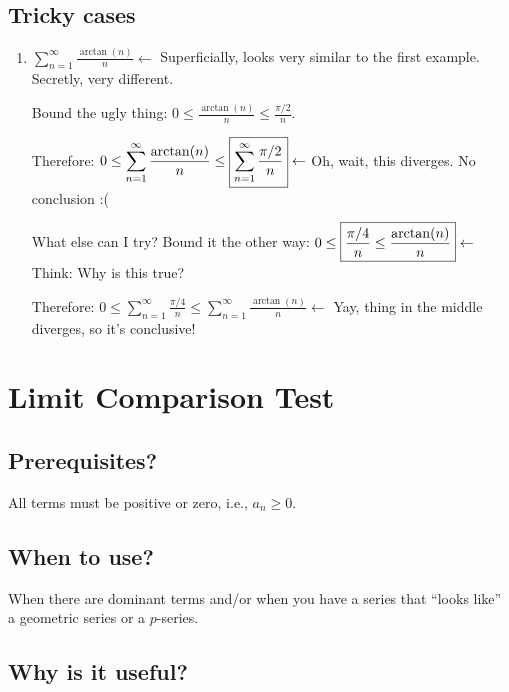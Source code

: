 \documentclass[11pt]{article}
\begin{document}
\subsection{Tricky cases}

\begin{enumerate}

  \item $\displaystyle \sum_{n=1}^\infty \frac{\arctan(n)}{n} \gets$
  Superficially, looks very similar to the first example. Secretly, very
  different.

  Bound the ugly thing: $\displaystyle 0 \leq \frac{\arctan(n)}{n} \leq
  \frac{\pi/2}{n}$.

  Therefore: $\displaystyle 0 \leq \displaystyle \sum_{n=1}^\infty
  \frac{\arctan(n)}{n} \leq
  \fbox{$\displaystyle\sum_{n=1}^\infty\frac{\pi/2}{n}$} \gets$ Oh, wait, this
  diverges. No conclusion :(

  What else can I try? Bound it the other way: $\displaystyle 0 \leq
  \fbox{$\displaystyle \frac{\pi/4}{n}
  \leq \frac{\arctan(n)}n$} \gets$ Think: Why is this true?

  Therefore: $\displaystyle 0 \leq \displaystyle \sum_{n=1}^\infty
  \frac{\pi/4}{n} \leq
  \sum_{n=1}^\infty\frac{\arctan(n)}{n} \gets$ Yay, thing in the middle
  diverges, so it's conclusive!

\end{enumerate}

\newpage
\section{Limit Comparison Test}

\subsection{Prerequisites?}

All terms must be positive or zero, i.e., $a_n \geq 0$.

\subsection{When to use?}

When there are dominant terms and/or when you have a series that ``looks like''
a geometric series or a $p$-series.

\subsection{Why is it useful?}
\end{document}
